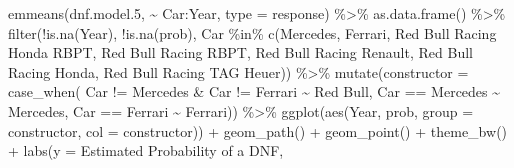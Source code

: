 \documentclass[
]{book}
\newenvironment{Shaded}{\begin{snugshade}}{\end{snugshade}}
\newcommand{\AttributeTok}[1]{\textcolor[rgb]{0.77,0.63,0.00}{#1}}
\newcommand{\FloatTok}[1]{\textcolor[rgb]{0.00,0.00,0.81}{#1}}
\newcommand{\FunctionTok}[1]{\textcolor[rgb]{0.00,0.00,0.00}{#1}}
\newcommand{\NormalTok}[1]{#1}
\newcommand{\SpecialCharTok}[1]{\textcolor[rgb]{0.00,0.00,0.00}{#1}}
\newcommand{\StringTok}[1]{\textcolor[rgb]{0.31,0.60,0.02}{#1}}
\begin{document}
\begin{Shaded}
\begin{Highlighting}[]
\FunctionTok{emmeans}\NormalTok{(dnf.model}\FloatTok{.5}\NormalTok{, }\SpecialCharTok{\textasciitilde{}}\NormalTok{ Car}\SpecialCharTok{:}\NormalTok{Year, }\AttributeTok{type =} \StringTok{\textquotesingle{}response\textquotesingle{}}\NormalTok{) }\SpecialCharTok{\%\textgreater{}\%} 
  \FunctionTok{as.data.frame}\NormalTok{() }\SpecialCharTok{\%\textgreater{}\%}
  \FunctionTok{filter}\NormalTok{(}\SpecialCharTok{!}\FunctionTok{is.na}\NormalTok{(Year),}
         \SpecialCharTok{!}\FunctionTok{is.na}\NormalTok{(prob),}
\NormalTok{         Car }\SpecialCharTok{\%in\%} \FunctionTok{c}\NormalTok{(}\StringTok{\textquotesingle{}Mercedes\textquotesingle{}}\NormalTok{, }\StringTok{\textquotesingle{}Ferrari\textquotesingle{}}\NormalTok{, }
                            \StringTok{\textquotesingle{}Red Bull Racing Honda RBPT\textquotesingle{}}\NormalTok{, }\StringTok{\textquotesingle{}Red Bull Racing RBPT\textquotesingle{}}\NormalTok{, }\StringTok{\textquotesingle{}Red Bull Racing Renault\textquotesingle{}}\NormalTok{, }\StringTok{\textquotesingle{}Red Bull Racing Honda\textquotesingle{}}\NormalTok{, }\StringTok{\textquotesingle{}Red Bull Racing TAG Heuer\textquotesingle{}}\NormalTok{)) }\SpecialCharTok{\%\textgreater{}\%} 
  \FunctionTok{mutate}\NormalTok{(}\AttributeTok{constructor =} \FunctionTok{case\_when}\NormalTok{(}
\NormalTok{    Car }\SpecialCharTok{!=} \StringTok{\textquotesingle{}Mercedes\textquotesingle{}} \SpecialCharTok{\&}\NormalTok{ Car }\SpecialCharTok{!=} \StringTok{\textquotesingle{}Ferrari\textquotesingle{}} \SpecialCharTok{\textasciitilde{}} \StringTok{\textquotesingle{}Red Bull\textquotesingle{}}\NormalTok{, }
\NormalTok{    Car }\SpecialCharTok{==} \StringTok{\textquotesingle{}Mercedes\textquotesingle{}} \SpecialCharTok{\textasciitilde{}} \StringTok{\textquotesingle{}Mercedes\textquotesingle{}}\NormalTok{, }
\NormalTok{    Car }\SpecialCharTok{==} \StringTok{\textquotesingle{}Ferrari\textquotesingle{}} \SpecialCharTok{\textasciitilde{}} \StringTok{\textquotesingle{}Ferrari\textquotesingle{}}\NormalTok{)) }\SpecialCharTok{\%\textgreater{}\%} 
  \FunctionTok{ggplot}\NormalTok{(}\FunctionTok{aes}\NormalTok{(Year, prob, }\AttributeTok{group =}\NormalTok{ constructor, }\AttributeTok{col =}\NormalTok{ constructor)) }\SpecialCharTok{+}
  \FunctionTok{geom\_path}\NormalTok{() }\SpecialCharTok{+}
  \FunctionTok{geom\_point}\NormalTok{() }\SpecialCharTok{+} 
  \FunctionTok{theme\_bw}\NormalTok{() }\SpecialCharTok{+}
  \FunctionTok{labs}\NormalTok{(}\AttributeTok{y =} \StringTok{\textquotesingle{}Estimated Probability of a DNF\textquotesingle{}}\NormalTok{,}

\end{Highlighting}
\end{Shaded}
\end{document}
